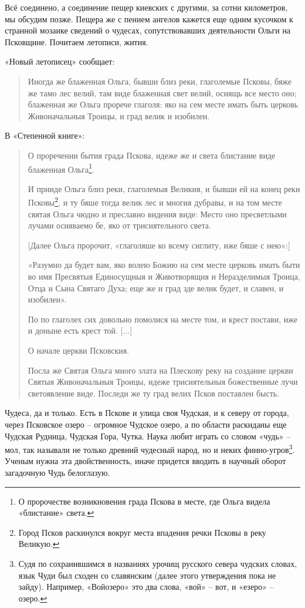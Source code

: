 Всё соединено, а соединение пещер киевских с другими, за сотни километров, мы обсудим позже. Пещера же с пением ангелов кажется еще одним кусочком к странной мозаике сведений о чудесах, сопутствовавших деятельности Ольги на Псковщине. Почитаем летописи, жития.

«Новый летописец» сообщает:

\begin{quotation}
Иногда же блаженная Ольга, бывши близ реки, глаголемые Псковы, бяже же тамо лес велий, там виде блаженная свет велий, осиящь все место оно; блаженная же Ольга прорече глаголя: яко на сем месте имать быть церковь Живоначальныя Троицы, и град велик и изобилен.
\end{quotation}

В «Степенной книге»:

\begin{quotation}
О проречении бытия града Пскова, идеже же и света блистание виде блаженная Ольга\footnote{О пророчестве возникновения града Пскова в месте, где Ольга видела «блистание» света.}.

И прииде Ольга близ реки, глаголемыя Великия, и бывши ей на конец реки Псковы\footnote{Город Псков раскинулся вокруг места впадения речки Псковы в реку Великую.}, и ту бяше тогда велик лес и многия дубравы, и на том месте святая Ольга чюдно и преславно видения виде: Место оно пресветлыми лучами осияваемо бе, яко от трисиятельного света.

[Далее Ольга пророчит, «глаголяше ко всему сиглиту, иже бяше с нею»:]

«Разумно да будет вам, яко волею Божию на сем месте церковь имать быти во имя Пресвятыя Единосущныя и Животворящия и Неразделимыя Троица, Отца и Сына Святаго Духа; еще же и град зде велик будет, и славен, и изобилен».

По по глаголех сих довольно помолися на месте том, и крест постави, иже и доныне есть крест той. [...]

О начале церкви Псковския. 

Посла же Святая Ольга много злата на Плескову реку на создание церкви Святыя Живоначальныя Троицы, идеже трисиятельныя божественные лучи светоявление виде. Последи же ту град велих Псков поставлен бысть.
\end{quotation}

Чудеса, да и только. Есть в Пскове и улица своя Чудская, и к северу от города, через Псковское озеро – огромное Чудское озеро, а по области раскиданы еще Чудская Рудница, Чудская Гора, Чутка. Наука любит играть со словом «чудь» – мол, так называли не только древний чудесный народ, но и неких финно-угров\footnote{Судя по сохранившимся в названиях урочищ русского севера чудских словах, язык Чуди был сходен со славянским (далее этого утверждения пока не зайду). Например, «Войозеро» это два слова, «вой» – вот, и «езеро» – озеро.}. Ученым нужна эта двойственность, иначе придется вводить в научный оборот загадочную Чудь белоглазую.


